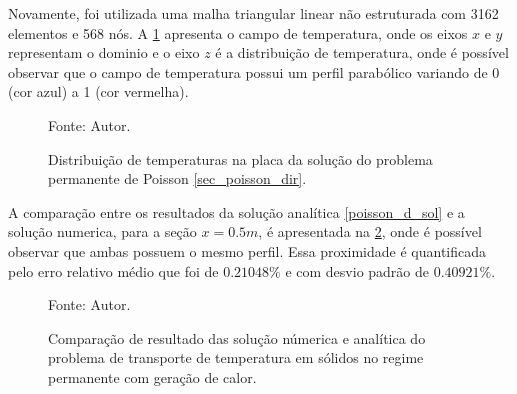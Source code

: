 Novamente, foi utilizada uma malha triangular linear não estruturada com 3162 elementos e 568 nós.
A \ref{poisson_d_3d} apresenta o campo de temperatura, onde os eixos $x$ e $y$ representam o dominio e o eixo $z$ é a distribuição de temperatura, onde é possível observar que o campo de temperatura possui um perfil parabólico variando de 0 (cor azul) a 1 (cor vermelha).
\begin{figure}[H]
    \centering
     {\raggedleft \scriptsize Fonte: Autor.}
    \caption{Distribuição de temperaturas na placa da solução do problema permanente de Poisson \ref{sec_poisson_dir}.}
    \label{poisson_d_3d}
\end{figure}

A comparação entre os resultados da solução analítica \eqref{poisson_d_sol} e a solução numerica, para a seção $x=0.5m$, é apresentada na \ref{poisson_d_perm_comp}, onde é possível observar que ambas possuem o mesmo perfil.
Essa proximidade é quantificada pelo erro relativo médio que foi de $0.21048\%$ e com desvio padrão de $0.40921\%$.
\begin{figure}[H]
    \centering
     {\raggedleft \scriptsize Fonte: Autor.}
    \caption{Comparação de resultado das solução númerica e analítica do problema de transporte de temperatura em sólidos no regime permanente com geração de calor.}
    \label{poisson_d_perm_comp}
\end{figure}

